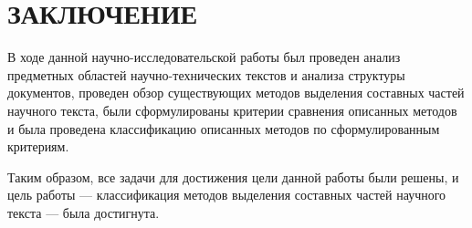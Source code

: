 \section*{ЗАКЛЮЧЕНИЕ}

В ходе данной научно-исследовательской работы был проведен анализ предметных областей научно-технических текстов и анализа структуры документов, проведен обзор существующих методов выделения составных частей научного текста, были сформулированы критерии сравнения описанных методов и была проведена классификацию описанных методов по сформулированным критериям.

Таким образом, все задачи для достижения цели данной работы были решены, и цель работы --- классификация методов выделения составных частей научного текста --- была достигнута.
